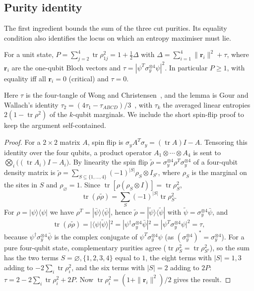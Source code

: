\subsection{Purity identity}\label{sec:fqe-entropy_maximum-purity-identity}

The first ingredient bounds the sum of the three cut purities. Its equality condition also
identifies the locus on which an entropy maximiser must lie.

\begin{lemma}\label{lem:fqe-purity} For a unit state, $P=\sum_{j=2}^4\operatorname{tr}\rho_{1j}^2=1+\tfrac12\Delta$ with
$\Delta=\sum_{i=1}^4\|\mathbf r_i\|^2+\tau$, where $\mathbf r_i$ are the one-qubit Bloch
vectors and $\tau=|\psi^T\sigma_y^{\otimes4}\psi|^2$. In particular $P\ge 1$, with equality iff all
$\mathbf r_i=0$ (critical) and $\tau=0$.

\end{lemma}

\noindent Here $\tau$ is the four-tangle of Wong and Christensen~\cite{WC}, and the lemma is
Gour and Wallach's identity $\tau_2=(4\tau_1-\tau_{ABCD})/3$~\cite[Theorem~6]{GW}, with
$\tau_k$ the averaged linear entropies $2(1-\operatorname{tr}\rho^2)$ of the $k$-qubit
marginals. We include the short spin-flip proof to keep the argument self-contained.

\begin{proof} For a \(2\times2\) matrix \(A\), spin flip is \(\sigma_y
A^T\sigma_y=(\operatorname{tr}A)I-A\). Tensoring this identity over the four qubits, a product
operator \(A_1\otimes\cdots\otimes A_4\) is sent to \(\bigotimes_i\bigl((\operatorname{tr}A_i)I-A_i\bigr)\).
By linearity the spin flip \(\tilde\rho=\sigma_y^{\otimes4}\rho^T\sigma_y^{\otimes4}\) of a four-qubit
density matrix is
\(\tilde\rho=\sum_{S\subseteq\{1,\ldots,4\}}(-1)^{|S|}\rho_S\otimes I_{S^c}\), where \(\rho_S\) is the
marginal on the sites in \(S\) and \(\rho_\varnothing=1\). Since
\(\operatorname{tr}[\rho(\rho_S\otimes I)]=\operatorname{tr}\rho_S^2\), \[
\operatorname{tr}(\rho\tilde\rho)=\sum_{S}(-1)^{|S|}\operatorname{tr}\rho_S^2 .
\] For \(\rho=|\psi\rangle\langle\psi|\) we have \(\rho^T=|\bar\psi\rangle\langle\bar\psi|\), hence
\(\tilde\rho=|\tilde\psi\rangle\langle\tilde\psi|\) with \(\tilde\psi=\sigma_y^{\otimes4}\bar\psi\), and
\[
\operatorname{tr}(\rho\tilde\rho)=|\langle\psi|\tilde\psi\rangle|^2
=|\psi^\dagger\sigma_y^{\otimes4}\bar\psi|^2=|\psi^T\sigma_y^{\otimes4}\psi|^2=\tau ,
\] because \(\psi^\dagger\sigma_y^{\otimes4}\bar\psi\) is the complex conjugate of
\(\psi^T\sigma_y^{\otimes4}\psi\) (as \((\sigma_y^{\otimes4})^*=\sigma_y^{\otimes4}\)). For a pure
four-qubit state, complementary purities agree (\(\operatorname{tr}\rho_S^2=\operatorname{tr}\rho_{S^c}^2\)),
so the sum has the two terms \(S=\varnothing,\{1,2,3,4\}\) equal to \(1\), the eight terms with
\(|S|=1,3\) adding to \(-2\sum_i\operatorname{tr}\rho_i^2\), and the six terms with \(|S|=2\)
adding to \(2P\): \(\tau=2-2\sum_i\operatorname{tr}\rho_i^2+2P\). Now
\(\operatorname{tr}\rho_i^2=(1+\|\mathbf r_i\|^2)/2\) gives the result. \end{proof}

